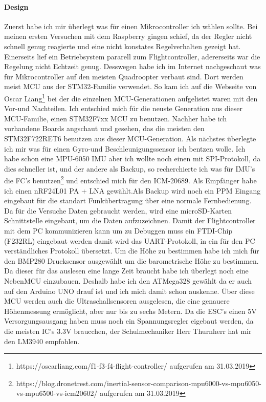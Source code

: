 \documentclass[12pt,a4paper, ngerman]{article}
\begin{document}
\paragraph{Design}
\iffalse
Zuerst habe ich mir überlegt was für einen Mikrocontroller ich wählen sollte. Bei meinen ersten Versuchen mit dem Raspberry gingen schief, da der Regler nicht schnell genug reagierte und eine nicht konstates Regelverhalten gezeigt hat. Einerseits lief ein Betriebsystem pararell zum Flightcontroller, adererseits war die Regelung nicht Echtzeit genug. Desswegen habe ich im Internet nachgeschaut was für Mikrocontroller auf den meisten Quadroopter verbaut sind. Dort werden  meist MCU aus der STM32-Familie verwendet. So kam ich auf die Webseite von Oscar Liang\footnote{\label{foot:1}https://oscarliang.com/f1-f3-f4-flight-controller/ aufgerufen am 31.03.2019} bei der die einzelnen MCU-Generationen aufgelistet waren mit den Vor-und Nachteilen. Ich entschied mich für die neuste Generation aus dieser MCU-Familie, einen STM32F7xx MCU zu benutzen. Nachher habe ich vorhandene Boards angschaut und gesehen, das die meisten den STM32F722RET6 benutzen aus dieser MCU-Generation. Als nächstes überlegte ich mir was für einen Gyro-und Beschleunigungssensor ich bentzen wolle. Ich habe schon eine MPU-6050 IMU aber ich wollte noch einen mit SPI-Protokoll, da dies schneller ist, und der andere als Backup, so recherchierte ich was für IMU's die FC's benutzen\footnote{\label{foot:2}https://blog.dronetrest.com/inertial-sensor-comparison-mpu6000-vs-mpu6050-vs-mpu6500-vs-icm20602/ aufgerufen am 31.03.2019} und entschied mich für den ICM-20689. Als Empfänger habe ich einen nRF24L01 PA + LNA gewählt.Als Backup wird noch ein PPM Eingang eingebaut für die standart Funkübertragung über eine normale Fernbedienung. Da für die Versuche Daten gebraucht werden, wird eine microSD-Karten Schnittstelle eingebaut, um die Daten aufzuzeichnen. Damit der Flightcontroller mit dem PC kommunizieren kann um zu Debuggen muss ein FTDI-Chip (F232RL) eingebaut werden damit wird das UART-Protokoll, in ein für den PC verständliches Protokoll übersetzt. Um die Höhe zu bestimmen habe ich mich für den BMP280 Drucksensor ausgewählt um die barometrische Höhe zu bestimmen. Da dieser für das auslesen eine lange Zeit braucht habe ich überlegt noch eine NebenMCU einzubauen. Deshalb habe ich den ATMega328 gewählt da er auch auf den Arduino UNO drauf ist und ich mich damit schon auskenne. Über diese MCU werden auch die Ultraschallsensoren ausgelesen, die eine genauere Höhenmessung ermöglicht, aber nur bis zu sechs Metern. Da die ESC's einen 5V Versorgungsausgang haben muss noch ein Spannungsregler  eigebaut werden, da die meisten IC's 3.3V braucchen, der Schulmechaniker Herr Thurnherr hat mir den LM3940 empfohlen.
\end{document}

